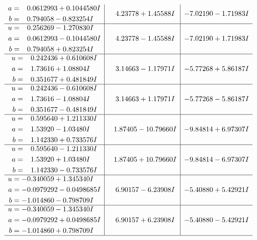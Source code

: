 \documentclass[1p]{elsarticle_modified}
\theoremstyle{definition}
\begin{document}
$$\begin{array}{c|c|c}
\begin{aligned}
a &= \phantom{-}0.0612993 + 0.1044580 I \\
b &= \phantom{-}0.794058 - 0.823254 I\end{aligned}
 & \phantom{-}4.23778 + 1.45588 I & -7.02190 - 1.71983 I \\ \hline\begin{aligned}
u &= \phantom{-}0.256269 - 1.270830 I \\
a &= \phantom{-}0.0612993 - 0.1044580 I \\
b &= \phantom{-}0.794058 + 0.823254 I\end{aligned}
 & \phantom{-}4.23778 - 1.45588 I & -7.02190 + 1.71983 I \\ \hline\begin{aligned}
u &= \phantom{-}0.242436 + 0.610608 I \\
a &= \phantom{-}1.73616 + 1.08804 I \\
b &= \phantom{-}0.351677 + 0.481849 I\end{aligned}
 & \phantom{-}3.14663 - 1.17971 I & -5.77268 + 5.86187 I \\ \hline\begin{aligned}
u &= \phantom{-}0.242436 - 0.610608 I \\
a &= \phantom{-}1.73616 - 1.08804 I \\
b &= \phantom{-}0.351677 - 0.481849 I\end{aligned}
 & \phantom{-}3.14663 + 1.17971 I & -5.77268 - 5.86187 I \\ \hline\begin{aligned}
u &= \phantom{-}0.595640 + 1.211330 I \\
a &= \phantom{-}1.53920 - 1.03480 I \\
b &= \phantom{-}1.142330 + 0.733576 I\end{aligned}
 & \phantom{-}1.87405 - 10.79660 I & -9.84814 + 6.97307 I \\ \hline\begin{aligned}
u &= \phantom{-}0.595640 - 1.211330 I \\
a &= \phantom{-}1.53920 + 1.03480 I \\
b &= \phantom{-}1.142330 - 0.733576 I\end{aligned}
 & \phantom{-}1.87405 + 10.79660 I & -9.84814 - 6.97307 I \\ \hline\begin{aligned}
u &= -0.340059 + 1.345340 I \\
a &= -0.0979292 - 0.0498685 I \\
b &= -1.014860 - 0.798709 I\end{aligned}
 & \phantom{-}6.90157 - 6.23908 I & -5.40880 + 5.42921 I \\ \hline\begin{aligned}
u &= -0.340059 - 1.345340 I \\
a &= -0.0979292 + 0.0498685 I \\
b &= -1.014860 + 0.798709 I\end{aligned}
 & \phantom{-}6.90157 + 6.23908 I & -5.40880 - 5.42921 I\\
 \hline 
 \end{array}$$\newpage\newpage\renewcommand{\arraystretch}{1}
\end{document}
